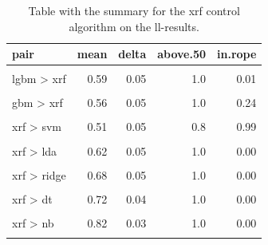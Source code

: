 \documentclass[twoside,11pt,preprint]{article}
\begin{document}
\begin{table}

\caption{\label{tab:control1}\label{tab:control}Table with the summary for the xrf control algorithm on the ll-results.}
\centering
\begin{tabular}[t]{lrrrr}
\toprule
\textbf{pair} & \textbf{mean} & \textbf{delta} & \textbf{above.50} & \textbf{in.rope}\\
\midrule
\cellcolor{gray!6}{rf > xrf} & \cellcolor{gray!6}{0.60} & \cellcolor{gray!6}{0.05} & \cellcolor{gray!6}{1.0} & \cellcolor{gray!6}{0.00}\\
lgbm > xrf & 0.59 & 0.05 & 1.0 & 0.01\\
\cellcolor{gray!6}{xgb > xrf} & \cellcolor{gray!6}{0.58} & \cellcolor{gray!6}{0.05} & \cellcolor{gray!6}{1.0} & \cellcolor{gray!6}{0.03}\\
gbm > xrf & 0.56 & 0.05 & 1.0 & 0.24\\
\cellcolor{gray!6}{mlp > xrf} & \cellcolor{gray!6}{0.54} & \cellcolor{gray!6}{0.05} & \cellcolor{gray!6}{1.0} & \cellcolor{gray!6}{0.65}\\
\addlinespace
xrf > svm & 0.51 & 0.05 & 0.8 & 0.99\\
\cellcolor{gray!6}{xrf > lr} & \cellcolor{gray!6}{0.58} & \cellcolor{gray!6}{0.05} & \cellcolor{gray!6}{1.0} & \cellcolor{gray!6}{0.04}\\
xrf > lda & 0.62 & 0.05 & 1.0 & 0.00\\
\cellcolor{gray!6}{xrf > svml} & \cellcolor{gray!6}{0.62} & \cellcolor{gray!6}{0.05} & \cellcolor{gray!6}{1.0} & \cellcolor{gray!6}{0.00}\\
xrf > ridge & 0.68 & 0.05 & 1.0 & 0.00\\
\addlinespace
\cellcolor{gray!6}{xrf > knn} & \cellcolor{gray!6}{0.69} & \cellcolor{gray!6}{0.05} & \cellcolor{gray!6}{1.0} & \cellcolor{gray!6}{0.00}\\
xrf > dt & 0.72 & 0.04 & 1.0 & 0.00\\
\cellcolor{gray!6}{xrf > qda} & \cellcolor{gray!6}{0.77} & \cellcolor{gray!6}{0.04} & \cellcolor{gray!6}{1.0} & \cellcolor{gray!6}{0.00}\\
xrf > nb & 0.82 & 0.03 & 1.0 & 0.00\\
\cellcolor{gray!6}{xrf > passive} & \cellcolor{gray!6}{0.85} & \cellcolor{gray!6}{0.03} & \cellcolor{gray!6}{1.0} & \cellcolor{gray!6}{0.00}\\
\bottomrule
\end{tabular}
\end{table}
\end{document}
